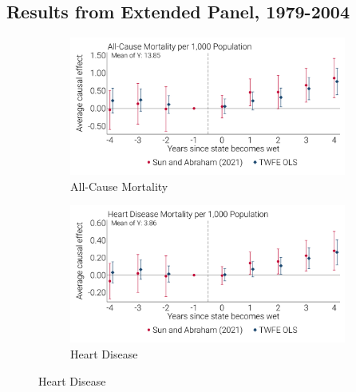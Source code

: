 \documentclass[12pt]{article}
\begin{document}
\FloatBarrier
\newpage 
{}
\begin{landscape}
\section[Results from Extended Panel, 1979-2004]{Results from Extended Panel, 1979-2004\label{sec:app-extend-panel}}
\setcounter{figure}{0}
\begin{figure}[!ht]
    \caption[Event Studies, 1979-2004]{Event Studies, 1979-2004}
    \centering
    \begin{subfigure}{0.49\linewidth}
        \centering 
        \caption[All-Cause Mortality]{All-Cause Mortality}        
        \includegraphics[width=1.0\linewidth]{../analysis/output/appendix/figure_b1a_es_extended_panel_deaths.png}
    \end{subfigure}
    \begin{subfigure}{0.49\linewidth}
        \centering 
        \caption[Heart Disease]{Heart Disease}        
        \includegraphics[width=1.0\linewidth]{../analysis/output/appendix/figure_b1b_es_extended_panel_heart.png}

\end{subfigure}
\end{figure}
\end{landscape}
\end{document}

